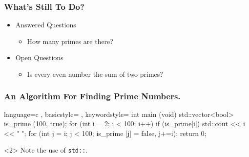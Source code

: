 \documentclass{beamer}
\begin{document}
\begin{frame}[t]
\frametitle{What's Still To Do?}
\begin{itemize}
	\item Answered Questions
		\begin{itemize}
			\item How many primes are there?
		\end{itemize}
	\item Open Questions
		\begin{itemize}
			\item Is every even number the sum of two primes?
		\end{itemize}
	\end{itemize}
\end{frame}

\begin{frame}[fragile]
\frametitle{An Algorithm For Finding Prime Numbers.}
\begin{Code*}[title={Finding Prime Numbers}]{%
	language=c%
	, basicstyle=\scriptsize\inconsolatafamily%
	, keywordstyle=\scriptsize\inconsolatafamily\bfseries%
}
int main (void)
{
	std::vector<bool> is_prime (100, true);
	for (int i = 2; i < 100; i++)
		if (is_prime[i])
		{
			std::cout << i << " ";
			for (int j = i; j < 100; is_prime [j] = false, j+=i);
		}
	return 0;
}
\end{Code*}
\begin{uncoverenv}<2>
Note the use of \verb|std::|.
\end{uncoverenv}
\end{frame}
\end{document}
